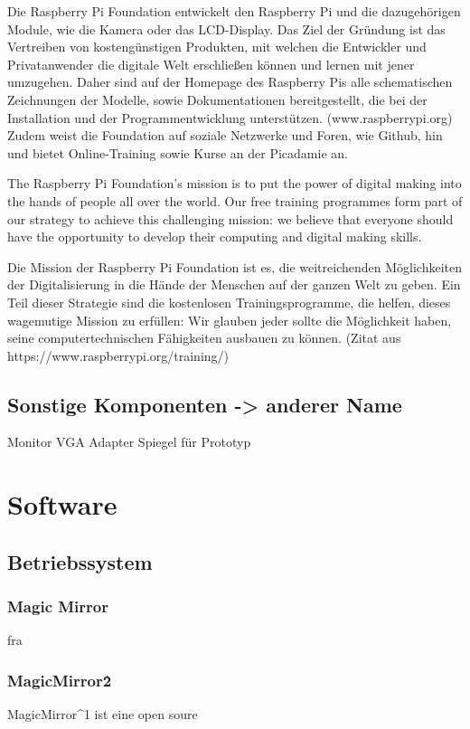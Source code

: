 \documentclass[12pt,a4paper]{report}
\begin{document}
Die Raspberry Pi Foundation entwickelt den Raspberry Pi und die dazugehörigen Module, wie die Kamera oder das LCD-Display. Das Ziel der Gründung ist das Vertreiben von kostengünstigen Produkten, mit welchen die Entwickler und Privatanwender die digitale Welt erschließen können und lernen mit jener umzugehen. Daher sind auf der Homepage des Raspberry Pis alle schematischen Zeichnungen der Modelle, sowie Dokumentationen bereitgestellt, die bei der Installation und der Programmentwicklung unterstützen. (www.raspberrypi.org)
Zudem weist die Foundation auf soziale Netzwerke und Foren, wie Github, hin und bietet Online-Training sowie Kurse an der Picadamie an.

The Raspberry Pi Foundation’s mission is to put the power of digital making into the hands of people all over the world. Our free training programmes form part of our strategy to achieve this challenging mission: we believe that everyone should have the opportunity to develop their computing and digital making skills.

Die Mission der Raspberry Pi Foundation ist es, die weitreichenden Möglichkeiten der Digitalisierung in die Hände der Menschen auf der ganzen Welt zu geben. Ein Teil dieser Strategie sind die kostenlosen Trainingsprogramme, die helfen, dieses wagemutige Mission zu erfüllen: Wir glauben jeder sollte die Möglichkeit haben, seine computertechnischen Fähigkeiten ausbauen zu können. (Zitat aus https://www.raspberrypi.org/training/)

\section{Sonstige Komponenten -> anderer Name}
Monitor VGA Adapter Spiegel für Prototyp
\chapter{Software}
\section{Betriebssystem}
\subsection*{Magic Mirror}
fra
\subsection*{MagicMirror\^2}
MagicMirror^1 ist eine open soure
\end{document}
